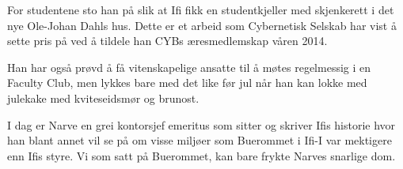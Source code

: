 For studentene sto han på slik at Ifi fikk en studentkjeller med skjenkerett i det nye Ole-Johan Dahls hus. Dette er et arbeid som Cybernetisk Selskab har vist å sette pris på ved å tildele han CYBs æresmedlemskap våren 2014.

Han har også prøvd å få vitenskapelige ansatte til å møtes regelmessig i en Faculty Club, men lykkes bare med det like før jul når han kan lokke med julekake med kviteseidsmør og brunost.

I dag er Narve en grei kontorsjef emeritus som sitter og skriver Ifis historie hvor han blant annet vil se på om visse miljøer som Buerommet i Ifi-I var mektigere enn Ifis styre. Vi som satt på Buerommet, kan bare frykte Narves snarlige dom.
